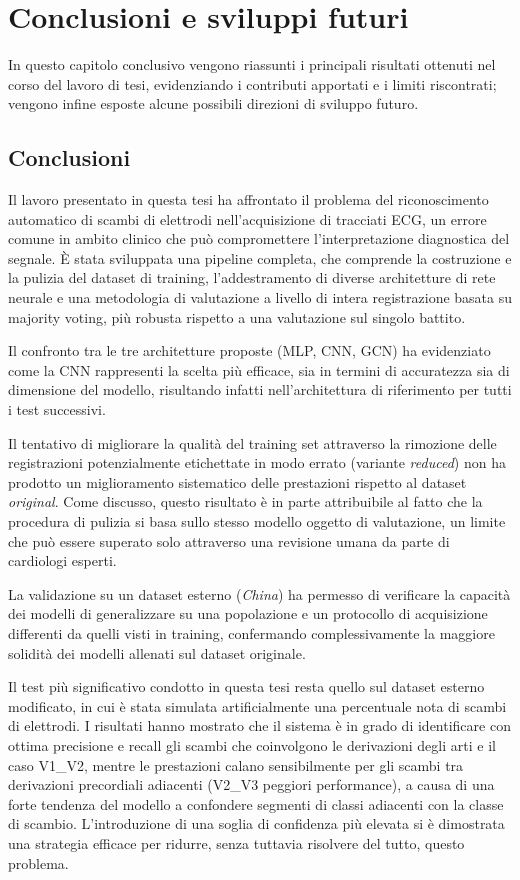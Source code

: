 \chapter{Conclusioni e sviluppi futuri}
\label{chap9}

In questo capitolo conclusivo vengono riassunti i principali risultati ottenuti nel corso del lavoro di tesi, evidenziando i contributi apportati e i limiti riscontrati; vengono infine esposte alcune possibili direzioni di sviluppo futuro.

\section{Conclusioni}

Il lavoro presentato in questa tesi ha affrontato il problema del riconoscimento automatico di scambi di elettrodi nell'acquisizione di tracciati ECG, un errore comune in ambito clinico che può compromettere l'interpretazione diagnostica del segnale. È stata sviluppata una pipeline completa, che comprende la costruzione e la pulizia del dataset di training, l'addestramento di diverse architetture di rete neurale e una metodologia di valutazione a livello di intera registrazione basata su majority voting, più robusta rispetto a una valutazione sul singolo battito.

Il confronto tra le tre architetture proposte (MLP, CNN, GCN) ha evidenziato come la CNN rappresenti la scelta più efficace, sia in termini di accuratezza sia di dimensione del modello, risultando infatti nell'architettura di riferimento per tutti i test successivi.

Il tentativo di migliorare la qualità del training set attraverso la rimozione delle registrazioni potenzialmente etichettate in modo errato (variante \emph{reduced}) non ha prodotto un miglioramento sistematico delle prestazioni rispetto al dataset \emph{original}. Come discusso, questo risultato è in parte attribuibile al fatto che la procedura di pulizia si basa sullo stesso modello oggetto di valutazione, un limite che può essere superato solo attraverso una revisione umana da parte di cardiologi esperti.

La validazione su un dataset esterno (\emph{China}) ha permesso di verificare la capacità dei modelli di generalizzare su una popolazione e un protocollo di acquisizione differenti da quelli visti in training, confermando complessivamente la maggiore solidità dei modelli allenati sul dataset originale.

Il test più significativo condotto in questa tesi resta quello sul dataset esterno modificato, in cui è stata simulata artificialmente una percentuale nota di scambi di elettrodi. I risultati hanno mostrato che il sistema è in grado di identificare con ottima precisione e recall gli scambi che coinvolgono le derivazioni degli arti e il caso V1\_V2, mentre le prestazioni calano sensibilmente per gli scambi tra derivazioni precordiali adiacenti (V2\_V3 peggiori performance), a causa di una forte tendenza del modello a confondere segmenti di classi adiacenti con la classe di scambio. L'introduzione di una soglia di confidenza più elevata si è dimostrata una strategia efficace per ridurre, senza tuttavia risolvere del tutto, questo problema.

